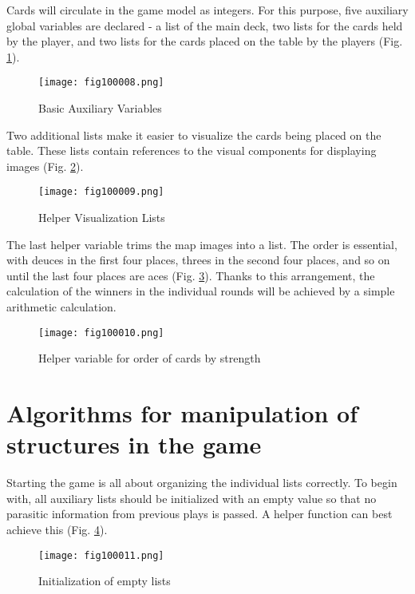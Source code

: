 Cards will circulate in the game model as integers. For this purpose, five auxiliary global variables are declared - a list of the main deck, two lists for the cards held by the player, and two lists for the cards placed on the table by the players (Fig. \ref{fig100008}).

\begin{figure}[H]
   \centering
   \texttt{[image: fig100008.png]}
   \caption{Basic Auxiliary Variables}
\label{fig100008}
\end{figure}

Two additional lists make it easier to visualize the cards being placed on the table. These lists contain references to the visual components for displaying images (Fig. \ref{fig100009}).

\begin{figure}[H]
   \centering
   \texttt{[image: fig100009.png]}
   \caption{Helper Visualization Lists}
\label{fig100009}
\end{figure}

The last helper variable trims the map images into a list. The order is essential, with deuces in the first four places, threes in the second four places, and so on until the last four places are aces (Fig. \ref{fig100010}). Thanks to this arrangement, the calculation of the winners in the individual rounds will be achieved by a simple arithmetic calculation.

\begin{figure}[H]
   \centering
   \texttt{[image: fig100010.png]}
   \caption{Helper variable for order of cards by strength}
\label{fig100010}
\end{figure}

\section{Algorithms for manipulation of structures in the game}

Starting the game is all about organizing the individual lists correctly. To begin with, all auxiliary lists should be initialized with an empty value so that no parasitic information from previous plays is passed. A helper function can best achieve this (Fig. \ref{fig100011}).

\begin{figure}[H]
   \centering
   \texttt{[image: fig100011.png]}
   \caption{Initialization of empty lists}
\label{fig100011}
\end{figure}

